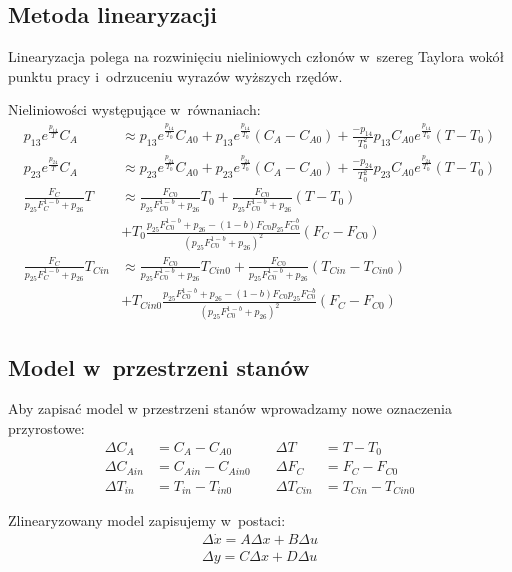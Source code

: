 \documentclass[a4paper,12pt]{article}
\begin{document}
\subsection{Metoda linearyzacji}

Linearyzacja polega na rozwinięciu nieliniowych członów w~szereg Taylora wokół punktu pracy i~odrzuceniu wyrazów wyższych rzędów.

Nieliniowości występujące w~równaniach:
\begin{align}
 p_{13}e^{\frac{p_{14}}{T}}C_A &\approx  p_{13}e^{\frac{p_{14}}{T_0}}C_{A0} + p_{13}e^{\frac{p_{14}}{T_0}}(C_A-C_{A0}) + \frac{-p_{14}}{T_0^2}p_{13}C_{A0}e^{\frac{p_{14}}{T_0}}(T-T_0)\\[6pt]
 p_{23}e^{\frac{p_{24}}{T}}C_A &\approx  p_{23}e^{\frac{p_{24}}{T_0}}C_{A0} + p_{23}e^{\frac{p_{24}}{T_0}}(C_A-C_{A0}) + \frac{-p_{24}}{T_0^2}p_{23}C_{A0}e^{\frac{p_{24}}{T_0}}(T-T_0)\\[6pt]
 \frac{F_C}{p_{25}F_C^{1-b}+p_{26}}T &\approx  \frac{F_{C0}}{p_{25}F_{C0}^{1-b}+p_{26}}T_0 + \frac{F_{C0}}{p_{25}F_{C0}^{1-b}+p_{26}}(T-T_0) \nonumber \\
 &+ T_0\frac{p_{25}F_{C0}^{1-b}+p_{26} - (1-b)F_{C0}p_{25}F_{C0}^{-b}}{(p_{25}F_{C0}^{1-b}+p_{26})^2}(F_C-F_{C0})\\[6pt]
  \frac{F_C}{p_{25}F_C^{1-b}+p_{26}}T_{Cin} &\approx  \frac{F_{C0}}{p_{25}F_{C0}^{1-b}+p_{26}}T_{Cin0} + \frac{F_{C0}}{p_{25}F_{C0}^{1-b}+p_{26}}(T_{Cin}-T_{Cin0})\nonumber \\
  &+ T_{Cin0}\frac{p_{25}F_{C0}^{1-b}+p_{26} - (1-b)F_{C0}p_{25}F_{C0}^{-b}}{(p_{25}F_{C0}^{1-b}+p_{26})^2}(F_C-F_{C0})
\end{align}

\subsection{Model w~przestrzeni stanów}
Aby zapisać model w przestrzeni stanów wprowadzamy nowe oznaczenia przyrostowe:
\begin{align}
    \Delta C_{A} &= C_{A}-C_{A0}  &\quad \Delta T &= T - T_0 \\
    \Delta C_{Ain} &= C_{Ain} - C_{Ain0} &\quad \Delta F_C &= F_C - F_{C0} \\
    \Delta T_{in} &= T_{in} - T_{in0} &\quad \Delta T_{Cin} &= T_{Cin} - T_{Cin0}
\end{align}

Zlinearyzowany model zapisujemy w~postaci:
\begin{align}
    \Delta \dot x = A\Delta x + B\Delta u \\
    \Delta y = C\Delta x + D  \Delta u
\end{align}
\end{document}

